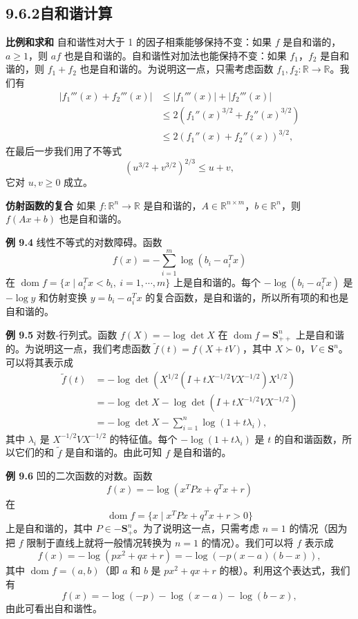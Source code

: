 \documentclass[UTF8, 12pt, fontset=fandol, oneside]{ctexart}
\begin{document}
\subsection*{9.6.2\quad 自和谐计算}

\noindent\textbf{比例和求和}\quad
自和谐性对大于 1 的因子相乘能够保持不变：如果 $f$ 是自和谐的，$a\geq1$，则 $af$ 也是自和谐的。自和谐性对加法也能保持不变：如果 $f_1$，$f_2$ 是自和谐的，则 $f_1+f_2$ 也是自和谐的。为说明这一点，只需考虑函数 $f_1,f_2:\mathbb{R}\to\mathbb{R}$。我们有
\[
\begin{aligned}
|f_1'''(x)+f_2'''(x)|
&\leq |f_1'''(x)|+|f_2'''(x)|\\
&\leq 2(f_1''(x)^{3/2}+f_2''(x)^{3/2})\\
&\leq 2(f_1''(x)+f_2''(x))^{3/2},
\end{aligned}
\]
在最后一步我们用了不等式
\[
(u^{3/2}+v^{3/2})^{2/3}\leq u+v,
\]
它对 $u,v\geq0$ 成立。

\noindent\textbf{仿射函数的复合}\quad
如果 $f:\mathbb{R}^n\to\mathbb{R}$ 是自和谐的，$A\in\mathbb{R}^{n\times m}$，$b\in\mathbb{R}^n$，则 $f(Ax+b)$ 也是自和谐的。

\noindent\textbf{例 9.4}\quad
线性不等式的对数障碍。函数
\[
f(x)=-\sum_{i=1}^m\log(b_i-a_i^Tx)
\]
在 $\operatorname{dom} f=\{x\mid a_i^Tx<b_i,\ i=1,\cdots,m\}$ 上是自和谐的。每个 $-\log(b_i-a_i^Tx)$ 是 $-\log y$ 和仿射变换 $y=b_i-a_i^Tx$ 的复合函数，是自和谐的，所以所有项的和也是自和谐的。

\noindent\textbf{例 9.5}\quad
对数-行列式。函数 $f(X)=-\log\det X$ 在 $\operatorname{dom} f=\mathbf{S}_{++}^n$ 上是自和谐的。为说明这一点，我们考虑函数 $\tilde{f}(t)=f(X+tV)$，其中 $X\succ0$，$V\in\mathbf{S}^n$。可以将其表示成
\[
\begin{aligned}
\tilde{f}(t)
&=-\log\det\left(X^{1/2}(I+tX^{-1/2}VX^{-1/2})X^{1/2}\right)\\
&=-\log\det X-\log\det(I+tX^{-1/2}VX^{-1/2})\\
&=-\log\det X-\sum_{i=1}^n\log(1+t\lambda_i),
\end{aligned}
\]
其中 $\lambda_i$ 是 $X^{-1/2}VX^{-1/2}$ 的特征值。每个 $-\log(1+t\lambda_i)$ 是 $t$ 的自和谐函数，所以它们的和 $\tilde{f}$ 是自和谐的。由此可知 $f$ 是自和谐的。

\noindent\textbf{例 9.6}\quad
凹的二次函数的对数。函数
\[
f(x)=-\log(x^TPx+q^Tx+r)
\]
在
\[
\operatorname{dom} f=\{x\mid x^TPx+q^Tx+r>0\}
\]
上是自和谐的，其中 $P\in-\mathbf{S}_+^n$。为了说明这一点，只需考虑 $n=1$ 的情况（因为把 $f$ 限制于直线上就将一般情况转换为 $n=1$ 的情况）。我们可以将 $f$ 表示成
\[
f(x)=-\log(px^2+qx+r)=-\log(-p(x-a)(b-x)),
\]
其中 $\operatorname{dom} f=(a,b)$（即 $a$ 和 $b$ 是 $px^2+qx+r$ 的根）。利用这个表达式，我们有
\[
f(x)=-\log(-p)-\log(x-a)-\log(b-x),
\]
由此可看出自和谐性。
\end{document}
